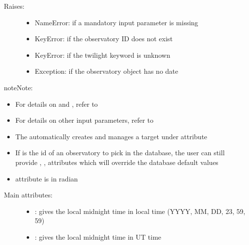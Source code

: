 \documentclass[letterpaper,10pt,english]{sphinxmanual}
\begin{document}
\begin{fulllineitems}
\begin{description}
\item[{Raises:}] \leavevmode\begin{itemize}
\item {} 
NameError: if a mandatory input parameter is missing

\item {} 
KeyError: if the observatory ID does not exist

\item {} 
KeyError: if the twilight keyword is unknown

\item {} 
Exception: if the observatory object has no date

\end{itemize}

\end{description}

\begin{notice}{note}{Note:}\begin{itemize}
\item {} 
For details on  and , refer to 

\item {} 
For details on other input parameters, refer to 

\item {} 
The  automatically creates and manages a  target under  attribute

\item {} 
If  is the id of an observatory to pick in the database, the user can still provide , ,  attributes which will override the database default values

\item {} 
 attribute is in radian

\end{itemize}
\end{notice}
\begin{description}
\item[{Main attributes:}] \leavevmode\begin{itemize}
\item {} 
: gives the local midnight time in local time (YYYY, MM, DD, 23, 59, 59)

\item {} 
: gives the local midnight time in UT time


\end{itemize}
\end{description}
\end{fulllineitems}
\end{document}
